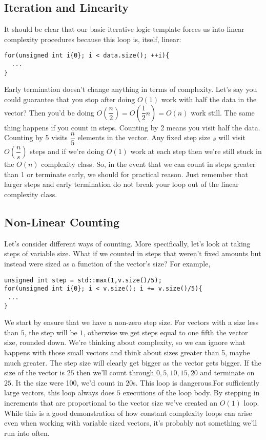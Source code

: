 \documentclass[]{tufte-handout}
\begin{document}
\subsection{Iteration and Linearity}

It should be clear that our basic iterative logic template forces us into linear complexity procedures because this loop is, itself, linear:
\begin{verbatim}
for(unsigned int i{0}; i < data.size(); ++i){
  ...
}
\end{verbatim}

Early termination doesn't change anything in terms of complexity. Let's say you could guarantee that you stop after doing $O(1)$ work with half the data in the vector? Then you'd be doing $O(\dfrac{n}{2}) = O(\dfrac{1}{2}n) = O(n)$ work still. The same thing happens if you count in steps. Counting by 2 means you visit half the data. Counting by 5 visits $\dfrac{n}{5}$ elements in the vector. Any fixed step size $s$ will visit $O(\dfrac{n}{s})$ steps and if we're doing $O(1)$ work at each step then we're still stuck in the $O(n)$ complexity class. So, in the event that we can count in steps greater than 1 or terminate early, we should for practical reason. Just remember that larger steps and early termination do not break your loop out of the linear complexity class. 

\subsection{Non-Linear Counting}

Let's consider different ways of counting. More specifically, let's look at taking steps of variable size. What if we counted in steps that weren't fixed amounts but instead were sized as a function of the vector's size? For example,
\begin{verbatim}
unsigned int step = std::max(1,v.size()/5);
for(unsigned int i{0}; i < v.size(); i += v.size()/5){
 ...
}
\end{verbatim}
We start by ensure that we have a non-zero step size. For vectors with a size less than $5$, the step will be $1$, otherwise we get steps equal to one fifth the vector size, rounded down. We're thinking about complexity, so we can ignore what happens with those small vectors and think about sizes greater than 5, maybe much greater. The step size will clearly get bigger as the vector gets bigger. If the size of the vector is $25$ then we'll count through $0,5,10,15,20$ and terminate on $25$. It the size were 100, we'd count in $20$s. This loop is dangerous.For sufficiently large vectors, this loop always does $5$ executions of the loop body. By stepping in increments that are proportional to the vector size we've created an $O(1)$ loop. While this is a good demonstration of how constant complexity loops can arise even when working with variable sized vectors, it's probably not something we'll run into often. 
\end{document}
